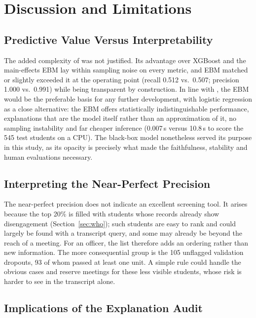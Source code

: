 \section{Discussion and Limitations}
\label{sec:discussion}

\subsection{Predictive Value Versus Interpretability}

The added complexity of \tabicl was not justified. Its advantage over XGBoost and the main-effects
EBM lay within sampling noise on every metric, and EBM matched or slightly exceeded it at the
operating point (recall 0.512 vs.\ 0.507; precision 1.000 vs.\ 0.991) while being transparent by
construction. In line with \citet{rudin2019stop}, the EBM would be the preferable basis for any further
development, with logistic regression as a close alternative: the EBM offers statistically
indistinguishable performance, explanations that are the model itself rather than an approximation
of it, no sampling instability and far cheaper inference (0.007\,s versus 10.8\,s to score the 545
test students on a CPU). The black-box model nonetheless served its purpose in this study, as its
opacity is precisely what made the faithfulness, stability and human evaluations necessary.

\subsection{Interpreting the Near-Perfect Precision}

The near-perfect precision does not indicate an excellent screening tool. It arises because the top
20\% is filled with students whose records already show disengagement (Section~\ref{sec:who}); such
students are easy to rank and could largely be found with a transcript query, and some may already
be beyond the reach of a meeting. For an officer, the list therefore adds an ordering rather than
new information. The more consequential group is the 105 unflagged validation dropouts, 93 of whom
passed at least one unit. A simple rule could handle the obvious cases and reserve meetings for these
less visible students, whose risk is harder to see in the transcript alone.

\subsection{Implications of the Explanation Audit}

